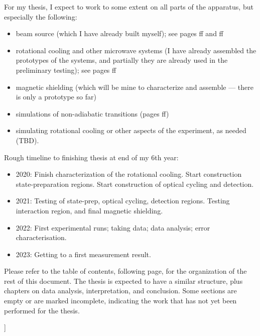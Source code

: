 \begin{@twocolumnfalse}
\begin{center}
\begin{minipage}{1.25\columnwidth}
For my thesis, I expect to work to some extent on all parts of the apparatus, but especially the following:
\begin{itemize}
    \item beam source (which I have already built myself); see pages \pageref{sect:beamsources}ff and \pageref{sect:beamsource}ff
    \item rotational cooling and other microwave systems (I have already assembled the prototypes of the systems, and partially they are already used in the preliminary testing); see pages \pageref{sect:rotcool}ff
    \item magnetic shielding (which will be mine to characterize and assemble --- there is only a prototype so far)
    \item simulations of non-adiabatic transitions (pages \pageref{sect:nonadiabatic}ff)
    \item simulating rotational cooling or other aspects of the experiment, as needed (TBD).
\end{itemize}
%
Rough timeline to finishing thesis at end of my 6th year:
%
\begin{itemize}
  \item 2020: Finish characterization of the rotational cooling. Start construction state-preparation regions. Start construction of optical cycling and detection.
  \item 2021: Testing of state-prep, optical cycling, detection regions. Testing interaction region, and final magnetic shielding.
  \item 2022: First experimental runs; taking data; data analysis; error characterisation.
  \item 2023: Getting to a first measurement result.
\end{itemize}
%
            Please refer to the table of contents, following page, for the organization of the rest of this document. The thesis is expected to have a similar structure, plus chapters on data analysis, interpretation, and conclusion. Some sections are empty or are marked incomplete, indicating the work that has not yet been performed for the thesis.

        \end{minipage}
        \vfill
    \end{center}
    \vspace{1cm}
\end{@twocolumnfalse}
]
